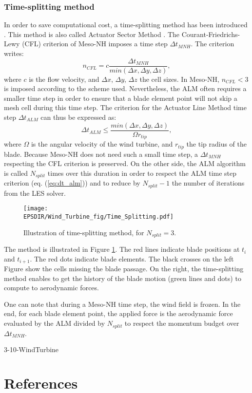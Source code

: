 \subsubsection*{Time-splitting method}
\label{sss:time_splitting}
In order to save computational cost, a time-splitting method has been introduced \citep{joulin2020theactuator}. This method is also called Actuator Sector Method \citep{Storey2015}. 
The Courant-Friedrichs-Lewy (CFL) criterion of Meso-NH imposes a time step $\Delta t_{MNH}$. The criterion writes:
\begin{equation}	
n_{CFL} =  c \dfrac{\Delta t_{MNH}}{min(\Delta x,\Delta y,\Delta z)},
\label{eq:MNH_CLF}
\end{equation}  
where $c$ is the flow velocity, and  $\Delta x$, $\Delta y$, $\Delta z$ the cell sizes. In Meso-NH, $n_{CFL} < 3$ is imposed according to the scheme used.
\medbreak
Nevertheless, the ALM often requires a smaller time step in order to ensure that a blade element point will not skip a mesh cell during this time step. The criterion for the Actuator Line Method time step $ \Delta t_{ALM}$ can thus be expressed as:
\begin{equation}
\Delta t_{ALM} \leqslant \dfrac{min(\Delta x,\Delta y,\Delta z)}{\Omega r_{tip}},
\label{eq:dt_alm}
\end{equation}
where $\Omega$ is the angular velocity of the wind turbine, and $r_{tip}$ the tip radius of the blade.
\medbreak
Because Meso-NH does not need such a small time step, a $\Delta t_{MNH}$ respecting the CFL criterion is preserved. On the other side, the ALM algorithm is called $N_{split}$ times over this duration in order to respect the ALM time step criterion (eq. (\ref{eq:dt_alm})) and to reduce by $N_{split} - 1$ the number of iterations from the LES solver.
\medbreak
\begin{figure}[h]
\centering
\texttt{[image: \\EPSDIR/Wind\_Turbine\_fig/Time\_Splitting.pdf]}
\caption{Illustration of time-splitting method, for $N_{split} = 3$. \cite{joulin2019modelisation}}
\label{fig:timesplit}  
\end{figure}
The method is illustrated in Figure \ref{fig:timesplit}. The red lines indicate blade positions at $t_{i}$ and $t_{i+1}$. The red dots indicate blade elements. The black crosses on the left Figure show the cells missing the blade passage. On the right, the time-splitting method enables to get the history of the blade motion (green lines and dots) to compute to aerodynamic forces.

One can note that during a Meso-NH time step, the wind field is frozen. In the end, for each blade element point, the applied force is the aerodynamic force evaluated by the ALM divided by $N_{split}$ to respect the momentum budget over $\Delta t_{MNH}$.


\begin{btSect}{3-10-WindTurbine}
\section{References}
\btPrintCited
\end{btSect}
